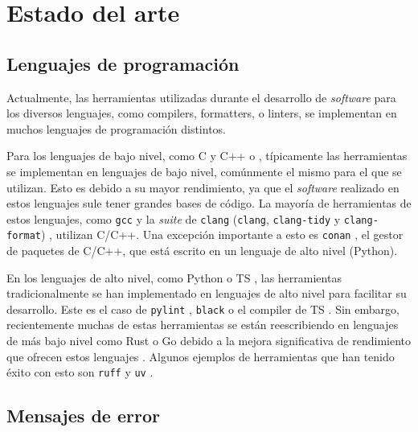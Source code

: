 \chapter{Estado del arte}\label{chap:state-of-the-art}

\section{Lenguajes de programación}

\newcommand{\progref}[1]{\texttt{#1} \parencite{#1}}

Actualmente, las herramientas utilizadas durante el desarrollo de
\textit{software} para los diversos lenguajes, como \glspl{compiler},
\glspl{formatter}, o \glspl{linter}, se implementan en muchos lenguajes de
programación distintos.

Para los lenguajes de bajo nivel, como C \parencite{C} y C++ \parencite{cpp} o
, típicamente las herramientas se implementan en
lenguajes de bajo nivel, comúnmente el mismo para el que se utilizan. Esto es
debido a su mayor rendimiento, ya que el \textit{software} realizado en estos
lenguajes sule tener grandes bases de código. La mayoría de herramientas de
estos lenguajes, como \progref{gcc} y la \textit{suite} de \verb!clang!
(\verb!clang!, \verb!clang-tidy! y \verb!clang-format!) \parencite{clang},
utilizan C/C++. Una excepción importante a esto es \progref{conan}, el gestor de
paquetes de C/C++, que está escrito en un lenguaje de alto nivel (Python).

En los lenguajes de alto nivel, como Python \parencite{Python} o \gls{TS}
\parencite{typescript}, las herramientas tradicionalmente se han implementado en
lenguajes de alto nivel para facilitar su desarrollo. Este es el caso de
\progref{pylint}, \progref{black} o el \gls{compiler} de \gls{TS}
\parencite{tsc}. Sin embargo, recientemente muchas de estas herramientas se
están reescribiendo en lenguajes de más bajo nivel como Rust \parencite{Rust} o
Go \parencite{Go} debido a la mejora significativa de rendimiento que ofrecen
estos lenguajes \parencite{typescript-go}. Algunos ejemplos de herramientas que
han tenido éxito con esto son \progref{ruff} y \progref{uv}.

\section{Mensajes de error}

